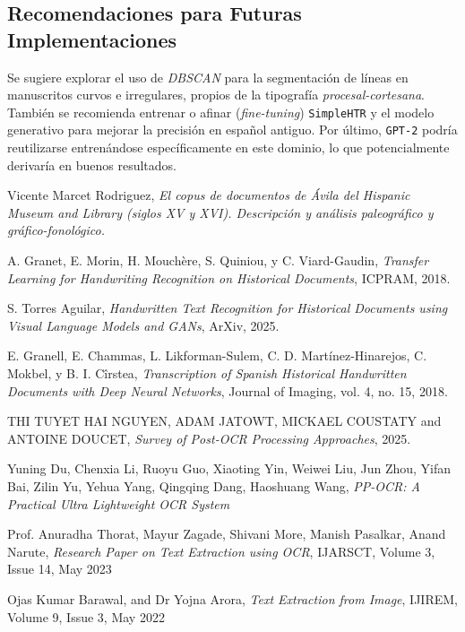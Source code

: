 \documentclass[11pt,a4paper]{article}
\begin{document}
\subsection{Recomendaciones para Futuras Implementaciones}

Se sugiere explorar el uso de \textit{DBSCAN} para la segmentación de líneas en manuscritos curvos e irregulares, propios de la tipografía \textit{procesal-cortesana}. También se recomienda entrenar o afinar (\textit{fine-tuning}) \texttt{SimpleHTR} y el modelo generativo para mejorar la precisión en español antiguo. Por último, \texttt{GPT-2} podría reutilizarse entrenándose específicamente en este dominio, lo que potencialmente derivaría en buenos resultados.

 


\begin{thebibliography}{9}

    Vicente Marcet Rodriguez,
    \textit{El copus de documentos de \'Avila del Hispanic Museum and Library (siglos XV y XVI). Descripci\'on y an\'alisis paleogr\'afico y gr\'afico-fonol\'ogico.}

    A. Granet, E. Morin, H. Mouchère, S. Quiniou, y C. Viard-Gaudin, 
    \textit{Transfer Learning for Handwriting Recognition on Historical Documents}, 
    ICPRAM, 2018.
    
    S. Torres Aguilar, 
    \textit{Handwritten Text Recognition for Historical Documents using Visual Language Models and GANs}, 
    ArXiv, 2025.
    
    E. Granell, E. Chammas, L. Likforman-Sulem, C. D. Martínez-Hinarejos, C. Mokbel, y B. I. Cîrstea, 
    \textit{Transcription of Spanish Historical Handwritten Documents with Deep Neural Networks}, 
    Journal of Imaging, vol. 4, no. 15, 2018.
    
    THI TUYET HAI NGUYEN, ADAM JATOWT, MICKAEL COUSTATY and ANTOINE DOUCET,
    \textit{Survey of Post-OCR Processing Approaches}, 
    2025.

    Yuning Du, Chenxia Li, Ruoyu Guo, Xiaoting Yin, Weiwei Liu,
    Jun Zhou, Yifan Bai, Zilin Yu, Yehua Yang, Qingqing Dang, Haoshuang Wang,
    \textit{PP-OCR: A Practical Ultra Lightweight OCR System}
    
    Prof. Anuradha Thorat, Mayur Zagade, Shivani More, Manish Pasalkar, Anand Narute,
    \textit{Research Paper on Text Extraction using OCR}, 
    IJARSCT, Volume 3, Issue 14, May 2023

    Ojas Kumar Barawal, and Dr Yojna Arora,
    \textit{Text Extraction from Image}, 
    IJIREM, Volume 9, Issue 3, May 2022

\end{thebibliography}
\end{document}

